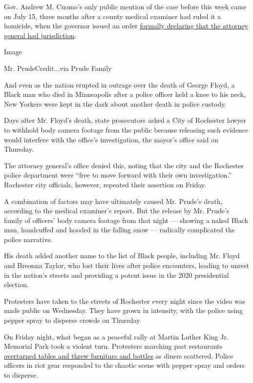 Gov. Andrew M. Cuomo's only public mention of the case before this week
came on July 15, three months after a county medical examiner had ruled
it a homicide, when the governor issued an order
\href{https://www.governor.ny.gov/news/no-14735-amendment-executive-order-147-special-prosecutor-investigate-and-prosecute-matters}{formally
declaring that the attorney general had jurisdiction}.

Image

Mr. PrudeCredit...via Prude Family

And even as the nation erupted in outrage over the death of George
Floyd, a Black man who died in Minneapolis after a police officer held a
knee to his neck, New Yorkers were kept in the dark about another death
in police custody.

Days after Mr. Floyd's death, state prosecutors asked a City of
Rochester lawyer to withhold body camera footage from the public because
releasing such evidence would interfere with the office's investigation,
the mayor's office said on Thursday.

The attorney general's office denied this, noting that the city and the
Rochester police department were ``free to move forward with their own
investigation.'' Rochester city officials, however, repeated their
assertion on Friday.

A combination of factors may have ultimately caused Mr. Prude's death,
according to the medical examiner's report. But the release by Mr.
Prude's family of officers' body camera footage from that night ---
showing a naked Black man, handcuffed and hooded in the falling snow ---
radically complicated the police narrative.

His death added another name to the list of Black people, including Mr.
Floyd and Breonna Taylor, who lost their lives after police encounters,
leading to unrest in the nation's streets and providing a potent issue
in the 2020 presidential election.

Protesters have taken to the streets of Rochester every night since the
video was made public on Wednesday. They have grown in intensity, with
the police using pepper spray to disperse crowds on Thursday.

On Friday night, what began as a peaceful rally at Martin Luther King
Jr. Memorial Park took a violent turn. Protesters marching past
restaurants
\href{https://twitter.com/ScooterCasterNY/status/1302060108898357257}{overturned
tables and threw furniture and bottles} as diners scattered. Police
officers in riot gear responded to the chaotic scene with pepper spray
and orders to disperse.

